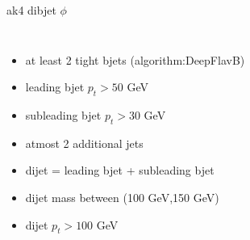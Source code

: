 \documentclass[10pt,xcolor=dvipsnames]{beamer}
\begin{document}
\begin{frame}[fragile]{ak4 dibjet $\phi $ }
\begin{columns}
\begin{itemize}
      \item {at least 2 tight bjets (algorithm:DeepFlavB)}
      \item {leading bjet $p_t > 50 $ GeV}
      \item {subleading bjet $p_t > 30 $ GeV}
      \item {atmost 2 additional jets}
      \item {dijet = leading bjet + subleading bjet}
      \item {dijet mass between (100 GeV,150 GeV)}
      \item {dijet $p_t > 100 $ GeV}
    \end{itemize}
  \end{columns}
\end{frame}






\end{document}
